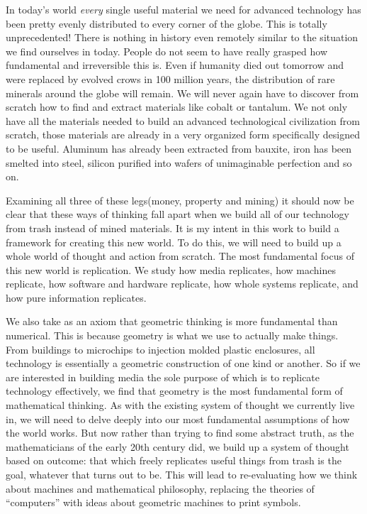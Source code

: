 In today's world \emph{every} single useful material we need for advanced technology has been pretty evenly distributed to every corner of the globe.  This is totally unprecedented! There is nothing in history even remotely similar to the situation we find ourselves in today.  People do not seem to have really grasped how fundamental and irreversible this is. Even if humanity died out tomorrow and were replaced by evolved crows in 100 million years, the distribution of rare minerals around the globe will remain.  We will never again have to discover from scratch how to find and extract materials like cobalt or tantalum.  We not only have all the materials needed to build an advanced technological civilization from scratch, those materials are already in a very organized form specifically designed to be useful.  Aluminum has already been extracted from bauxite, iron has been smelted into steel, silicon purified into wafers of unimaginable perfection and so on.  

Examining all three of these legs(money, property and mining) it should now be clear that these ways of thinking fall apart when we build all of our technology from trash instead of mined materials.  It is my intent in this work to build a framework for creating this new world.  To do this, we will need to build up a whole world of thought and action from scratch.  The most fundamental focus of this new world is replication.  We study how media replicates, how machines replicate, how software and hardware replicate, how whole systems replicate, and how pure information replicates.  

We also take as an axiom that geometric thinking is more fundamental than numerical.  This is because geometry is what we use to actually make things.  From buildings to microchips to injection molded plastic enclosures, all technology is essentially a geometric construction of one kind or another.  So if we are interested in building media the sole purpose of which is to replicate technology effectively, we find that geometry is the most fundamental form of mathematical thinking.  As with the existing system of thought we currently live in, we will need to delve deeply into our most fundamental assumptions of how the world works.  But now rather than trying to find some abstract truth, as the mathematicians of the early 20th century did, we build up a system of thought based on outcome: that which freely replicates useful things from trash is the goal, whatever that turns out to be.  This will lead to re-evaluating how we think about machines and mathematical philosophy, replacing the theories of ``computers'' with ideas about geometric machines to print symbols.  

